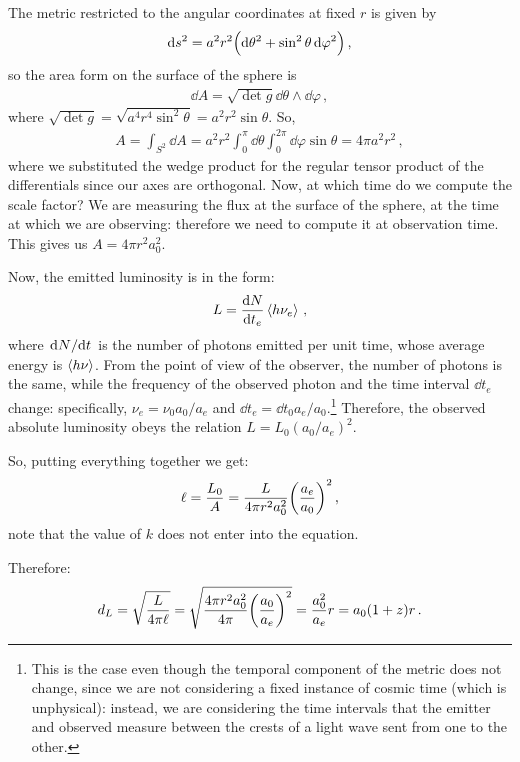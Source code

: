 \documentclass[main.tex]{subfiles}
\begin{document}
The metric restricted to the angular coordinates at fixed \(r\) is given by 
%
\begin{align}
\dd{s^2} = a^2 r^2 \qty(\dd{\theta^2} + \sin^2\theta \dd{\varphi^2})
\,,
\end{align}
%
so the area form on the surface of the sphere is 
%
\begin{align}
\dd{A} = \sqrt{ \det g} \dd{\theta } \wedge \dd{\varphi }
\,,
\end{align}
%
where \(\sqrt{ \det g} = \sqrt{a^{4} r^{4} \sin^2\theta } = a^2r^2 \sin \theta \). 
So,
%
\begin{align}
A = \int_{S^{2}}  \dd{A} = a^2r^2 \int_{0}^{\pi } \dd{\theta } \int_{0}^{2 \pi } \dd{\varphi } \sin \theta = 4 \pi a^2r^2 
\,,
\end{align}
%
where we substituted the wedge product for the regular tensor product of the differentials since our axes are orthogonal.
Now, at which time do we compute the scale factor? We are measuring the flux at the surface of the sphere, at the time at which we are observing: therefore we need to compute it at observation time. This gives us \(A = 4 \pi r^2a_0^2\).

Now, the emitted luminosity is in the form: 
%
\begin{align}
L = \dv{N}{t_{e}} \expval{h \nu_{e} }
\,,
\end{align}
%
where \(\dv*{N}{t}\) is the number of photons emitted per unit time, whose average energy is \(\expval{h \nu }\).
From the point of view of the observer, the number of photons is the same, while the frequency of the observed photon and the time interval \(\dd{t_{e}}\) change: specifically, \(\nu_{e} = \nu_0 a_0 / a_e\) and \(\dd{t_{e}} = \dd{t_0 } a_e / a_0 \).\footnote{This is the case even though the temporal component of the metric does not change, since we are not considering a fixed instance of cosmic time (which is unphysical): instead, we are considering the time intervals that the emitter and observed measure between the crests of a light wave sent from one to the other.}
Therefore, the observed absolute luminosity obeys the relation \(L= L_0 (a_0 / a_e)^2 \).

So, putting everything together we get:
%
\begin{equation}
  \ell = \frac{L_0 }{A} 
  = \frac{L}{4 \pi r^2 a_0 ^2} \qty(\frac{a_e}{a_0}) ^2
  \,,
\end{equation}
%
note that the value of \(k\) does not enter into the equation.

Therefore:
%
\begin{equation} \label{eq:luminosity-distance}
d_L = \sqrt{\frac{L}{4 \pi \ell}}
= \sqrt{\frac{4 \pi r^2a_0^2}{4 \pi } \qty(\frac{a_0}{a_e})^2}
= \frac{a_0^2}{a_e} r = a_0  (1+z) r\,.
\end{equation}
\end{document}

